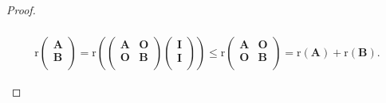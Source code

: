 \documentclass[../../main.tex]{subfiles}%
\begin{document}
\begin{proof}
\begin{enumerate}[(1)]
\begin{align*}
\\
\mathrm{r}\left( \begin{array}{c}
\boldsymbol{A}\\
\boldsymbol{B}\\
\end{array} \right) =\mathrm{r}\left( \left( \begin{matrix}
\boldsymbol{A}&		\boldsymbol{O}\\
\boldsymbol{O}&		\boldsymbol{B}\\
\end{matrix} \right) \left( \begin{array}{c}
\boldsymbol{I}\\
\boldsymbol{I}\\
\end{array} \right) \right) \leqslant \mathrm{r}\left( \begin{matrix}
\boldsymbol{A}&		\boldsymbol{O}\\
\boldsymbol{O}&		\boldsymbol{B}\\
\end{matrix} \right) =\mathrm{r}\left( \boldsymbol{A} \right) +\mathrm{r}\left( \boldsymbol{B} \right) .
\end{align*}


\end{enumerate}
\end{proof}
\end{document}
